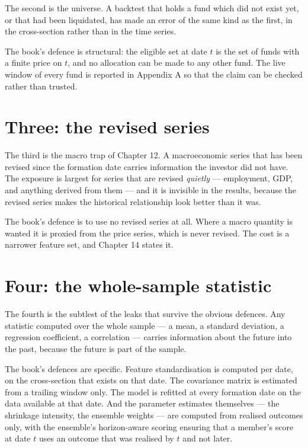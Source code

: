 The second is the universe. A backtest that holds a fund which did not
exist yet, or that had been liquidated, has made an error of the same kind
as the first, in the cross-section rather than in the time series.

The book's defence is structural: the eligible set at date \(t\) is the set
of funds with a finite price on \(t\), and no allocation can be made to any
other fund. The live window of every fund is reported in Appendix A so
that the claim can be checked rather than trusted.

\section{Three: the revised series}

The third is the macro trap of Chapter 12. A macroeconomic series that has
been revised since the formation date carries information the investor did
not have. The exposure is largest for series that are revised
\emph{quietly} --- employment, GDP, and anything derived from them --- and
it is invisible in the results, because the revised series makes the
historical relationship look better than it was.

The book's defence is to use no revised series at all. Where a macro
quantity is wanted it is proxied from the price series, which is never
revised. The cost is a narrower feature set, and Chapter 14 states it.

\section{Four: the whole-sample statistic}

The fourth is the subtlest of the leaks that survive the obvious defences.
Any statistic computed over the whole sample --- a mean, a standard
deviation, a regression coefficient, a correlation --- carries information
about the future into the past, because the future is part of the sample.

The book's defences are specific. Feature standardisation is computed per
date, on the cross-section that exists on that date. The covariance matrix
is estimated from a trailing window only. The model is refitted at every
formation date on the data available at that date. And the parameter
estimates themselves --- the shrinkage intensity, the ensemble weights ---
are computed from realised outcomes only, with the ensemble's horizon-aware
scoring ensuring that a member's score at date \(t\) uses an outcome that
was realised by \(t\) and not later.

